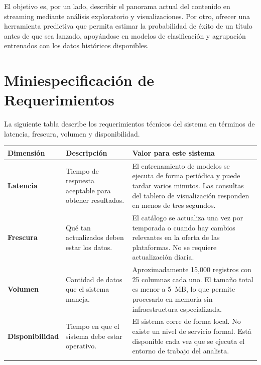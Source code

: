 \documentclass[12pt,a4paper]{article}
\begin{document}
El objetivo es, por un lado, describir el panorama actual del contenido en streaming mediante an\'alisis exploratorio y visualizaciones. Por otro, ofrecer una herramienta predictiva que permita estimar la probabilidad de \'exito de un t\'itulo antes de que sea lanzado, apoy\'andose en modelos de clasificaci\'on y agrupaci\'on entrenados con los datos hist\'oricos disponibles.

\newpage
\section*{Miniespecificaci\'on de Requerimientos}

La siguiente tabla describe los requerimientos t\'ecnicos del sistema en t\'erminos de latencia, frescura, volumen y disponibilidad.

\vspace{0.5cm}

\begin{center}
\begin{tabular}{>{\bfseries}p{3cm} p{4.2cm} p{6.8cm}}
\toprule
Dimensi\'on & Descripci\'on & Valor para este sistema \\
\midrule
\addlinespace[0.2cm]
Latencia &
Tiempo de respuesta aceptable para obtener resultados. &
El entrenamiento de modelos se ejecuta de forma peri\'odica y puede tardar varios minutos. Las consultas del tablero de visualizaci\'on responden en menos de tres segundos. \\
\addlinespace[0.4cm]
Frescura &
Qu\'e tan actualizados deben estar los datos. &
El cat\'alogo se actualiza una vez por temporada o cuando hay cambios relevantes en la oferta de las plataformas. No se requiere actualizaci\'on diaria. \\
\addlinespace[0.4cm]
Volumen &
Cantidad de datos que el sistema maneja. &
Aproximadamente 15{,}000 registros con 25 columnas cada uno. El tama\~no total es menor a 5~MB, lo que permite procesarlo en memoria sin infraestructura especializada. \\
\addlinespace[0.4cm]
Disponibilidad &
Tiempo en que el sistema debe estar operativo. &
El sistema corre de forma local. No existe un nivel de servicio formal. Est\'a disponible cada vez que se ejecuta el entorno de trabajo del analista. \\
\addlinespace[0.2cm]
\bottomrule
\end{tabular}
\end{center}
\end{document}
